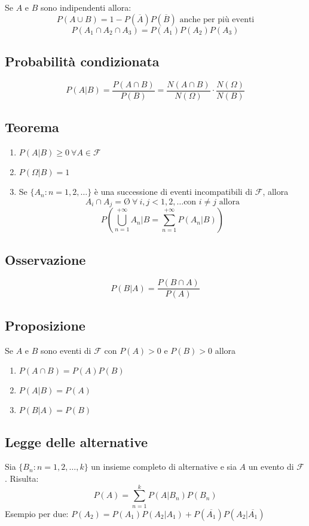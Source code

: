 \begin{multicols*}{2}
Se $A$ e $B$ sono indipendenti allora:
$$P(A \cup B) = 1 - P(\overline{A})P(\overline{B})\text{ anche per più eventi}$$
$$P(A_1 \cap A_2 \cap A_3) = P(A_1)P(A_2)P(A_3)$$

\subsection*{Probabilità condizionata}
$$
P(A|B) = \frac{P(A \cap B)}{P(B)} = \frac{N(A \cap B)}{N(\Omega)} \cdot \frac{N(\Omega)}{N(B)}
$$

\subsection*{Teorema}
\begin{enumerate}
    \item $P(A|B) \ge 0 \ \forall A \in \mathscr{F}$
    \item $P(\Omega | B) = 1$
    \item Se $\{A_n: n = 1,2,\dots\}$ è una successione di eventi
    incompatibili di $\mathscr{F}$, allora
    $$A_i \cap A_j = \text{\O} \ \forall \ i,j < 1,2,\dots \text{con } i \neq j \text{ allora}$$
    $$P \left(\bigcup^{+\infty}_{n=1} A_n | B = \sum_{n=1}^{+\infty}P(A_n | B) \right)$$
\end{enumerate}

\subsection*{Osservazione}
$$
P(B|A) = \frac{P(B \cap A)}{P(A)}
$$

\subsection*{Proposizione}
Se $A$ e $B$ sono eventi di $\mathscr{F}$ con $P(A) > 0$ e $P(B) > 0$ allora
\begin{enumerate}
    \item $P(A \cap B) = P(A)P(B)$
    \item $P(A|B) = P(A)$
    \item $P(B|A) = P(B)$
\end{enumerate}

\subsection*{Legge delle alternative}
Sia $\{B_n : n = 1,2,\dots,k\}$ un insieme completo di alternative e sia $A$ 
un evento di $\mathscr{F}$. Risulta:
$$
P(A) = \sum_{n=1}^{k}P(A|B_n)P(B_n)
$$
Esempio per due: $P(A_2) = P(A_1)P(A_2 | A_1) + P(\overline{A_1})P(A_2 | \overline{A_1})$


\end{multicols*}
